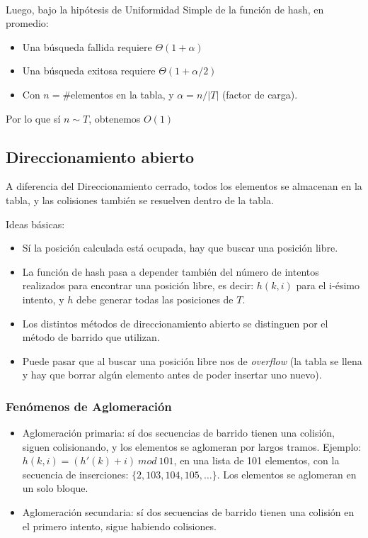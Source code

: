 ~

Luego, bajo la hip\'otesis de Uniformidad Simple de la funci\'on de hash, en promedio:
\begin{itemize}
\item Una b\'usqueda fallida requiere $\Theta(1+\alpha)$
\item Una b\'usqueda exitosa requiere $\Theta(1+\alpha / 2)$
\item Con $n=\#$elementos en la tabla, y $\alpha = n / |T|$ (factor de carga).
\end{itemize}

Por lo que sí $n \sim T$, obtenemos $O(1)$

\subsection{Direccionamiento abierto}
A diferencia del Direccionamiento cerrado, todos los elementos se almacenan en la tabla, y las colisiones tambi\'en se resuelven dentro de la tabla.

Ideas b\'asicas:
\begin{itemize}
\item S\'i la posici\'on calculada est\'a ocupada, hay que buscar una posici\'on libre.
\item La funci\'on de hash pasa a depender tambi\'en del n\'umero de intentos realizados para encontrar una posici\'on libre, es decir: $h(k,i)$ para el i-\'esimo intento, y $h$ debe generar todas las posiciones de $T$.
\item Los distintos m\'etodos de direccionamiento abierto se distinguen por el m\'etodo de barrido que utilizan.
\item Puede pasar que al buscar una posici\'on libre nos de \textit{overflow} (la tabla se llena y hay que borrar alg\'un elemento antes de poder insertar uno nuevo).
\end{itemize}

\subsubsection{Fen\'omenos de Aglomeraci\'on}
\begin{itemize}
\item Aglomeraci\'on primaria: s\'i dos secuencias de barrido tienen una colisi\'on, siguen colisionando, y los elementos se aglomeran por largos tramos.
Ejemplo: $h(k,i) = (h'(k) + i)\ mod\ 101$, en una lista de 101 elementos, con la secuencia de inserciones: $\{2, 103, 104, 105,\dots\}$. Los elementos se aglomeran en un solo bloque.
\item Aglomeraci\'on secundaria: s\'i dos secuencias de barrido tienen una colisi\'on en el primero intento, sigue habiendo colisiones.
\end{itemize}

